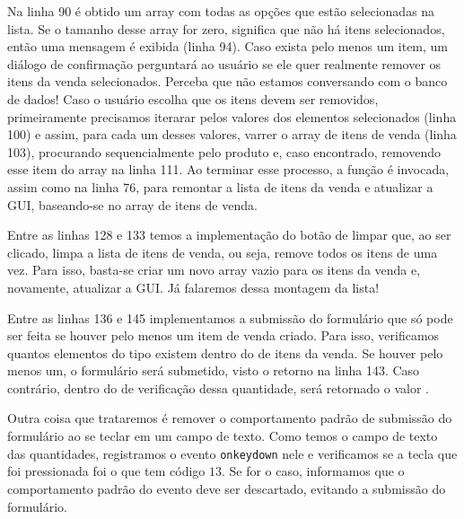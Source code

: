 Na linha 90 é obtido um array com todas as opções que estão selecionadas na lista. Se o tamanho desse array for zero, significa que não há itens selecionados, então uma mensagem é exibida (linha 94). Caso exista pelo menos um item, um diálogo de confirmação perguntará ao usuário se ele quer realmente remover os itens da venda selecionados. Perceba que não estamos conversando com o banco de dados! Caso o usuário escolha que os itens devem ser removidos, primeiramente precisamos iterarar pelos valores dos elementos selecionados (linha 100) e assim, para cada um desses valores, varrer o array de itens de venda (linha 103), procurando sequencialmente pelo produto e, caso encontrado, removendo esse item do array na linha 111. Ao terminar esse processo, a função  é invocada, assim como na linha 76, para remontar a lista de itens da venda e atualizar a GUI, baseando-se no array de itens de venda.

Entre as linhas 128 e 133 temos a implementação do botão de limpar que, ao ser clicado, limpa a lista de itens de venda, ou seja, remove todos os itens de uma vez. Para isso, basta-se criar um novo array vazio para os itens da venda e, novamente, atualizar a GUI. Já falaremos dessa montagem da lista!

Entre as linhas 136 e 145 implementamos a submissão do formulário que só pode ser feita se houver pelo menos um item de venda criado. Para isso, verificamos quantos elementos do tipo  existem dentro do  de itens da venda. Se houver pelo menos um, o formulário será submetido, visto o retorno  na linha 143. Caso contrário, dentro do  de verificação dessa quantidade, será retornado o valor .

Outra coisa que trataremos é remover o comportamento padrão de submissão do formulário ao se teclar  em um campo de texto. Como temos o campo de texto das quantidades, registramos o evento \texttt{onkeydown} nele e verificamos se a tecla que foi pressionada foi o  que tem código $13$. Se for o caso, informamos que o comportamento padrão do evento deve ser descartado, evitando a submissão do formulário.

